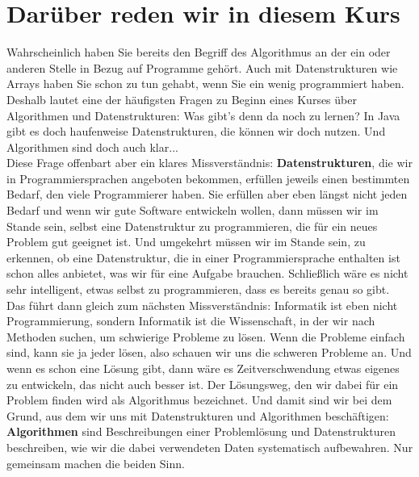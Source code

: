 \section{Darüber reden wir in diesem Kurs}

Wahrscheinlich haben Sie bereits den Begriff des Algorithmus an der ein oder anderen Stelle in Bezug auf Programme gehört. Auch mit Datenstrukturen wie Arrays haben Sie schon zu tun gehabt, wenn Sie ein wenig programmiert haben. Deshalb lautet eine der häufigsten Fragen zu Beginn eines Kurses über Algorithmen und Datenstrukturen: \glqq{}Was gibt's denn da noch zu lernen? In Java gibt es doch haufenweise Datenstrukturen, die können wir doch nutzen. Und Algorithmen sind doch auch klar...\grqq{}\\

Diese Frage offenbart aber ein klares Missverständnis: \textbf{Datenstrukturen}, die wir in Programmiersprachen angeboten bekommen, erfüllen jeweils einen bestimmten Bedarf, den viele Programmierer haben. Sie erfüllen aber eben längst nicht jeden Bedarf und wenn wir gute Software entwickeln wollen, dann müssen wir im Stande sein, selbst eine Datenstruktur zu programmieren, die für ein neues Problem gut geeignet ist. Und umgekehrt müssen wir im Stande sein, zu erkennen, ob eine Datenstruktur, die in einer Programmiersprache enthalten ist schon alles anbietet, was wir für eine Aufgabe brauchen. Schließlich wäre es nicht sehr intelligent, etwas selbst zu programmieren, dass es bereits genau so gibt.\\

Das führt dann gleich zum nächsten Missverständnis: Informatik ist eben nicht Programmierung, sondern Informatik ist die Wissenschaft, in der wir nach Methoden suchen, um schwierige Probleme zu lösen. Wenn die Probleme einfach sind, kann sie ja jeder lösen, also schauen wir uns die schweren Probleme an. Und wenn es schon eine Lösung gibt, dann wäre es Zeitverschwendung etwas eigenes zu entwickeln, das nicht auch besser ist. Der Lösungsweg, den wir dabei für ein Problem finden wird als Algorithmus bezeichnet. Und damit sind wir bei dem Grund, aus dem wir uns mit Datenstrukturen und Algorithmen beschäftigen: \textbf{Algorithmen} sind Beschreibungen einer Problemlösung und Datenstrukturen beschreiben, wie wir die dabei verwendeten Daten systematisch aufbewahren. Nur gemeinsam machen die beiden Sinn.\\

